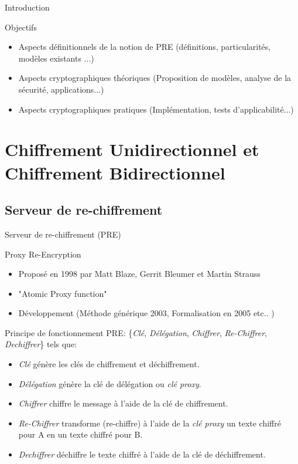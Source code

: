 \documentclass{beamer}
\begin{document}
\begin{frame}{Introduction}
	\begin{block}{Objectifs}
		\begin{itemize}
			\item Aspects définitionnels de la notion de PRE (définitions, particularités, modèles existants ...)
			\item Aspects cryptographiques théoriques (Proposition de modèles, analyse de la sécurité, applications...)
			\item Aspects cryptographiques pratiques (Implémentation, tests d'applicabilité...)
		\end{itemize}
	\end{block}
\end{frame}

\section{Chiffrement Unidirectionnel et Chiffrement Bidirectionnel}
\subsection{Serveur de re-chiffrement}
\begin{frame}{Serveur de re-chiffrement (PRE)}
	\begin{block}{Proxy Re-Encryption}
		\begin{itemize}
			\item Proposé en 1998 par Matt Blaze, Gerrit Bleumer et Martin Strauss
			\item "Atomic Proxy function"
			\item Développement (Méthode générique 2003, Formalisation en 2005 etc.. ) 
		\end{itemize}
	\end{block}
	\begin{block}{Principe de fonctionnement}
	PRE:  \{\textit{Clé}, \textit{Délégation}, \textit{Chiffrer}, \textit{Re-Chiffrer}, \textit{Dechiffrer}\} tels que:
	\begin{itemize}
		\item \textit{Clé} génère les clés de chiffrement et déchiffrement.
		\item \textit{Délégation} génère la clé de délégation ou \textit{clé proxy}.
		\item \textit{Chiffrer} chiffre le message à l'aide de la clé de chiffrement.
		\item \textit{Re-Chiffrer} transforme (re-chiffre) à l'aide de la \textit{clé proxy} un texte chiffré pour A en un texte chiffré pour B.
		\item  \textit{Dechiffrer} déchiffre le texte chiffré à l'aide de la clé de déchiffrement.
	\end{itemize}
	\end{block}
\end{frame}
\end{document}
